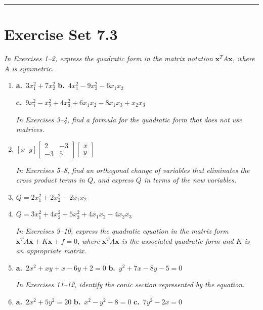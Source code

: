 \documentclass{article}
\begin{document}
\vspace{3mm}
\noindent\rule{\linewidth}{0.5pt}

\section*{Exercise Set 7.3}

\noindent\textit{In Exercises 1--2, express the quadratic form in the matrix notation
$\mathbf{x}^T A\mathbf{x}$, where $A$ is symmetric.}

\begin{enumerate}

\item \textbf{a.}\ $3x_1^2+7x_2^2$
\hspace{20pt}
\textbf{b.}\ $4x_1^2-9x_2^2-6x_1x_2$

\quad\textbf{c.}\ $9x_1^2-x_2^2+4x_3^2+6x_1x_2-8x_1x_3+x_2x_3$

\noindent\textit{In Exercises 3--4, find a formula for the quadratic form that does not use
matrices.}

\item[3.] $[x\;\;y]\begin{bmatrix}2&-3\\-3&5\end{bmatrix}\begin{bmatrix}x\\y\end{bmatrix}$

\noindent\textit{In Exercises 5--8, find an orthogonal change of variables that eliminates the
cross product terms in $Q$, and express $Q$ in terms of the new variables.}

\item[5.] $Q = 2x_1^2+2x_2^2-2x_1x_2$

\item[7.] $Q = 3x_1^2+4x_2^2+5x_3^2+4x_1x_2-4x_2x_3$

\noindent\textit{In Exercises 9--10, express the quadratic equation in the matrix form
$\mathbf{x}^T A\mathbf{x}+K\mathbf{x}+f=0$, where $\mathbf{x}^T A\mathbf{x}$ is the associated
quadratic form and $K$ is an appropriate matrix.}

\item[9.] \textbf{a.}\ $2x^2+xy+x-6y+2=0$
\hspace{20pt}
\textbf{b.}\ $y^2+7x-8y-5=0$

\noindent\textit{In Exercises 11--12, identify the conic section represented by the equation.}

\item[11.] \textbf{a.}\ $2x^2+5y^2=20$
\hspace{20pt}
\textbf{b.}\ $x^2-y^2-8=0$
\hspace{20pt}
\textbf{c.}\ $7y^2-2x=0$


\end{enumerate}
\end{document}
